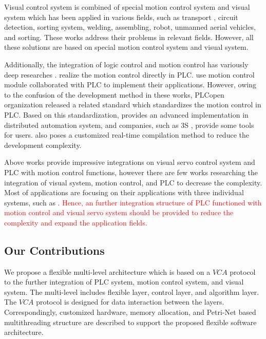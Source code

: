 \documentclass[journal,UTF8]{IEEEtran}
\begin{document}
Visual control system is combined of special motion control system and visual system which has been applied in various fields, such as transport \cite{Xing2014Intersection}, circuit detection\cite{Nian2005An}, sorting system, welding\cite{Chen2014A}, assembling\cite{Wang2008Visual,Xiao2014Visual}, robot\cite{Wu2013Cloud,Tsai2017A}, unmanned aerial vehicles\cite{Guenard2010A,Serra2016Landing}, and sorting\cite{Sun2013Automatic}. These works address their problems in relevant fields. However, all these solutions are based on special motion control system and visual system.

Additionally, the integration of logic control and motion control has variously deep researches \cite{Ioannides2004Design,Shi2016The,Fang2017Design, syaichu2011model}. \cite{Ioannides2004Design,syaichu2011model} realize the motion control directly in PLC. \cite{Peng2011Linear, Qian2014A, OMRON2006CS1W} use motion control module collaborated with PLC to implement their applications. However, owing to the confusion of the development method in these works, PLCopen organization released a related standard \cite{PLCopen2005Function} which standardizes the motion control in PLC. Based on this standardization, \cite{S2006Advanced} provides an advanced implementation in distributed automation system, and companies, such as 3S \cite{3S2017Logic}, provide some tools for users. \cite{wu2018customized} also poses a customized real-time compilation method to reduce the development complexity.

Above works provide impressive integrations on visual servo control system and PLC with motion control functions, however there are few works researching the integration of visual system, motion control, and PLC to decrease the complexity. Most of applications are focusing on their applications with three individual systems, such as \cite{Chen2014A}. \textcolor{red}{Hence, an further integration structure of PLC functioned with motion control and visual servo system should be provided to reduce the complexity and expand the application fields.}

\subsection{Our Contributions}
We propose a flexible multi-level architecture which is based on a $VCA$ protocol to the further integration of PLC system, motion control system, and visual system. The multi-level includes flexible layer, control layer, and algorithm layer. The $VCA$ protocol is designed for data interaction between the layers. Correspondingly, customized hardware, memory allocation, and Petri-Net based multithreading structure are described to support the proposed flexible software architecture.
\end{document}
